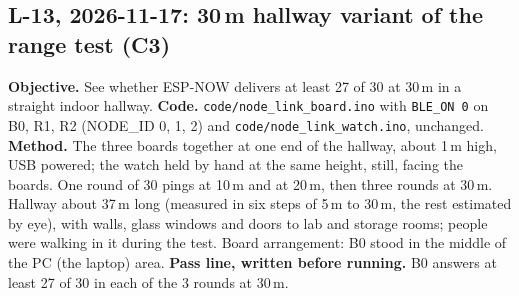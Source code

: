 \IfFileExists{IEEEtran.cls}{\documentclass[conference]{IEEEtran}}{\documentclass[10pt,twocolumn]{article}}
\begin{document}
\subsection*{L-13, 2026-11-17: 30\,m hallway variant of the range test (C3)}
\textbf{Objective.} See whether ESP-NOW delivers at least 27 of 30 at 30\,m in a straight indoor hallway. \textbf{Code.} \texttt{code/node\_link\_board.ino} with \texttt{BLE\_ON 0} on B0, R1, R2 (NODE\_ID 0, 1, 2) and \texttt{code/node\_link\_watch.ino}, unchanged. \textbf{Method.} The three boards together at one end of the hallway, about 1\,m high, USB powered; the watch held by hand at the same height, still, facing the boards. One round of 30 pings at 10\,m and at 20\,m, then three rounds at 30\,m. Hallway about 37\,m long (measured in six steps of 5\,m to 30\,m, the rest estimated by eye), with walls, glass windows and doors to lab and storage rooms; people were walking in it during the test. Board arrangement: B0 stood in the middle of the PC (the laptop) area. \textbf{Pass line, written before running.} B0 answers at least 27 of 30 in each of the 3 rounds at 30\,m.
\end{document}

